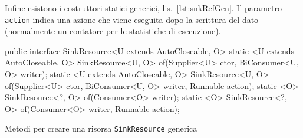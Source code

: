 Infine esistono i costruttori statici generici, lis.~\ref{lst:snkRefGen}.
Il parametro \texttt{action} indica una azione che viene eseguita dopo la
scrittura del dato (normalmente un contatore per le statistiche di esecuzione).

\begin{elisting}[!htb]
\begin{javacode}
public interface SinkResource<U extends AutoCloseable, O> {
    static <U extends AutoCloseable, O> SinkResource<U, O> of(Supplier<U> ctor, BiConsumer<U, O> writer);
    static <U extends AutoCloseable, O> SinkResource<U, O> of(Supplier<U> ctor, BiConsumer<U, O> writer,
                                                              Runnable action);
    static <O> SinkResource<?, O> of(Consumer<O> writer);
    static <O> SinkResource<?, O> of(Consumer<O> writer, Runnable action);
}
\end{javacode}
\caption{Metodi per creare una risorsa \texttt{SinkResource} generica}
\label{lst:snkRefGen}
\end{elisting}
